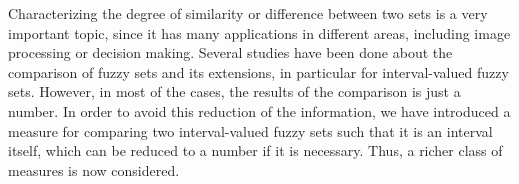 
Characterizing the degree of similarity or difference between two sets is a very important topic, since it has many applications in different areas, including image processing or decision making. Several studies have been done about the comparison of fuzzy sets and its extensions, in particular for interval-valued fuzzy sets. However, in most of the cases, the results of the comparison is just a number. In order to avoid this reduction of the information, we have introduced a measure for comparing two interval-valued fuzzy sets such that it is an interval itself, which can be reduced to a number if it is  necessary. Thus,  a richer class of measures is now considered.


